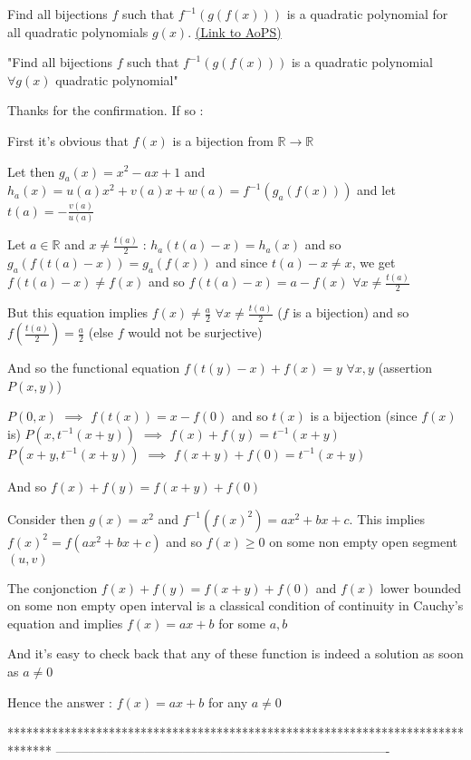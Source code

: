 \begin{problem}
	Find all bijections $f$ such that $f^{-1}(g(f(x)))$ is a quadratic polynomial for all quadratic polynomials $g(x)$.
	\flushright \href{https://artofproblemsolving.com/community/c6h393948}{(Link to AoPS)}
\end{problem}



\begin{solution}
	\begin{tcolorbox}"Find all bijections $f$ such that $f^{-1}(g(f(x)))$ is a quadratic polynomial $\forall g(x)$ quadratic polynomial"\end{tcolorbox}
Thanks for the confirmation. If so :

First it's obvious that $f(x)$ is a bijection from $\mathbb R\to\mathbb R$

Let then $g_a(x)=x^2-ax+1$ and $h_a(x)=u(a)x^2+v(a)x+w(a)=f^{-1}(g_a(f(x)))$ and let $t(a)=-\frac{v(a)}{u(a)}$

Let $a\in\mathbb R$ and $x\ne \frac {t(a)}2$ : $h_a(t(a)-x)=h_a(x)$ and so $g_a(f(t(a)-x))=g_a(f(x))$
and since $t(a)-x\ne x$, we get $f(t(a)-x)\ne f(x)$ and so $f(t(a)-x)=a-f(x)$ $\forall x\ne  \frac {t(a)}2$

But this equation implies $f(x)\ne \frac a2$ $\forall x\ne\frac{t(a)}2$ ($f$ is a bijection) and so $f(\frac{t(a)}2)=\frac a2$ (else $f$ would not be surjective)

And so the functional equation $f(t(y)-x)+f(x)=y$ $\forall x,y$ (assertion $P(x,y)$)

$P(0,x)$ $\implies$ $f(t(x))=x-f(0)$ and so $t(x)$ is a bijection (since $f(x)$ is)
$P(x,t^{-1}(x+y))$ $\implies$ $f(x)+f(y)=t^{-1}(x+y)$
$P(x+y,t^{-1}(x+y))$ $\implies$ $f(x+y)+f(0)=t^{-1}(x+y)$

And so $f(x)+f(y)=f(x+y)+f(0)$

Consider then $g(x)=x^2$ and $f^{-1}(f(x)^2)=ax^2+bx+c$.
This implies $f(x)^2=f(ax^2+bx+c)$ and so $f(x)\ge 0$ on some non empty open segment $(u,v)$

The conjonction $f(x)+f(y)=f(x+y)+f(0)$ and $f(x)$ lower bounded on some non empty open interval is a classical condition of continuity in Cauchy's equation and implies $f(x)=ax+b$ for some $a,b$

And it's easy to check back that any of these function is indeed a solution as soon as $a\ne 0$

Hence the answer : $\boxed{f(x)=ax+b}$ for any $a\ne 0$
\end{solution}
*******************************************************************************
-------------------------------------------------------------------------------

